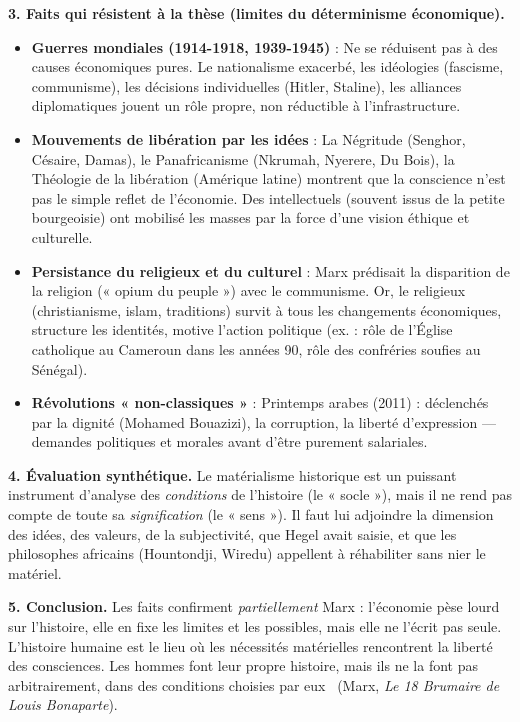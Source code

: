 \documentclass[11pt]{article}
\newcommand{\cle}[1]{{\popxbold\color{popdark}#1}}
\begin{document}
\begin{exoresolu}
\textbf{3. Faits qui résistent à la thèse (limites du déterminisme économique).}
\begin{itemize}
\item \textbf{Guerres mondiales (1914-1918, 1939-1945)} : Ne se réduisent pas à des causes économiques pures. Le nationalisme exacerbé, les idéologies (fascisme, communisme), les décisions individuelles (Hitler, Staline), les alliances diplomatiques jouent un rôle propre, non réductible à l'infrastructure.
\item \textbf{Mouvements de libération par les idées} : La \cle{Négritude} (Senghor, Césaire, Damas), le \cle{Panafricanisme} (Nkrumah, Nyerere, Du Bois), la \cle{Théologie de la libération} (Amérique latine) montrent que la conscience n'est pas le simple reflet de l'économie. Des intellectuels (souvent issus de la petite bourgeoisie) ont mobilisé les masses par la force d'une vision éthique et culturelle.
\item \textbf{Persistance du religieux et du culturel} : Marx prédisait la disparition de la religion (« opium du peuple ») avec le communisme. Or, le religieux (christianisme, islam, traditions) survit à tous les changements économiques, structure les identités, motive l'action politique (ex. : rôle de l'Église catholique au Cameroun dans les années 90, rôle des confréries soufies au Sénégal).
\item \textbf{Révolutions « non-classiques »} : Printemps arabes (2011) : déclenchés par la dignité (Mohamed Bouazizi), la corruption, la liberté d'expression — demandes politiques et morales avant d'être purement salariales.
\end{itemize}

\textbf{4. Évaluation synthétique.} Le matérialisme historique est un puissant instrument d'analyse des \emph{conditions} de l'histoire (le « socle »), mais il ne rend pas compte de toute sa \emph{signification} (le « sens »). Il faut lui adjoindre la dimension des idées, des valeurs, de la subjectivité, que Hegel avait saisie, et que les philosophes africains (Hountondji, Wiredu) appellent à réhabiliter sans nier le matériel.

\textbf{5. Conclusion.} Les faits confirment \emph{partiellement} Marx : l'économie pèse lourd sur l'histoire, elle en fixe les limites et les possibles, mais elle ne l'écrit pas seule. L'histoire humaine est le lieu où les nécessités matérielles rencontrent la liberté des consciences. \guillemotleft Les hommes font leur propre histoire, mais ils ne la font pas arbitrairement, dans des conditions choisies par eux \guillemotright\ (Marx, \emph{Le 18 Brumaire de Louis Bonaparte}).
\end{exoresolu}
\end{document}
